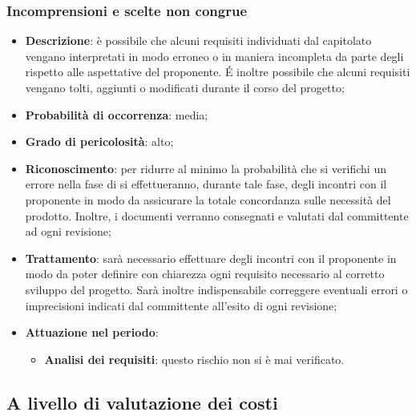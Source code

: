 		\subsubsection{Incomprensioni e scelte non congrue}
		\begin{itemize}
			\item \textbf{Descrizione}: è possibile che alcuni requisiti individuati dal capitolato vengano interpretati in modo erroneo o in maniera incompleta da parte degli \textit{\Anas} rispetto alle aspettative del proponente. \'E inoltre possibile che alcuni requisiti vengano tolti, aggiunti o modificati durante il corso del progetto;
			\item \textbf{Probabilità di occorrenza}: media;
			\item \textbf{Grado di pericolosità}: alto;
			\item \textbf{Riconoscimento}: per ridurre al minimo la probabilità che si verifichi un errore nella fase di \textit{\AdR} si effettueranno, durante tale fase, degli incontri con il proponente in modo da assicurare la totale concordanza sulle necessità del prodotto. Inoltre, i documenti verranno consegnati e valutati dal committente ad ogni revisione;
			\item \textbf{Trattamento}: sarà necessario effettuare degli incontri con il proponente in modo da poter definire con chiarezza ogni requisito necessario al corretto sviluppo del progetto. Sarà inoltre indispensabile correggere eventuali errori o imprecisioni indicati dal committente all'esito di ogni revisione;
			\item \textbf{Attuazione nel periodo}:
			\begin{itemize}
				\item \textbf{Analisi dei requisiti}: questo rischio non si è mai verificato.
			\end{itemize}
		\end{itemize}
	
	\subsection{A livello di valutazione dei costi}
	

